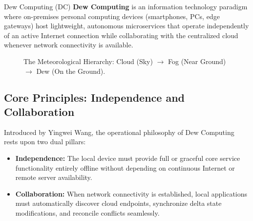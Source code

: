 \begin{defbox}{Dew Computing (DC)}
\textbf{Dew Computing} is an information technology paradigm where on-premises personal computing devices (smartphones, PCs, edge gateways) host lightweight, autonomous microservices that operate independently of an active Internet connection while collaborating with the centralized cloud whenever network connectivity is available.
\end{defbox}

\begin{figure}[H]
\centering
{}
\caption{The Meteorological Hierarchy: Cloud (Sky) $\to$ Fog (Near Ground) $\to$ Dew (On the Ground).}
\end{figure}

\subsection{Core Principles: Independence and Collaboration}
Introduced by Yingwei Wang, the operational philosophy of Dew Computing rests upon two dual pillars:
\begin{itemize}[leftmargin=*]
  \item \textbf{Independence:} The local device must provide full or graceful core service functionality entirely offline without depending on continuous Internet or remote server availability.
  \item \textbf{Collaboration:} When network connectivity is established, local applications must automatically discover cloud endpoints, synchronize delta state modifications, and reconcile conflicts seamlessly.
\end{itemize}

